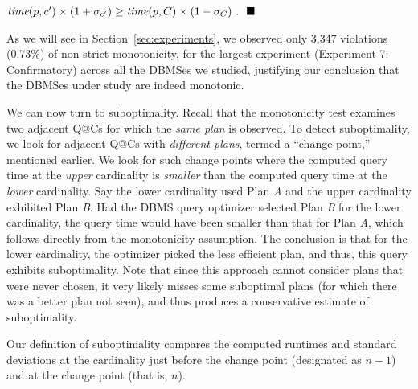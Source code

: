 \documentclass[prodmode,acmtods]{acmsmall}
\makeatletter
\def\QatC{Q{@}C}
\makeatother
\begin{document}
\quad\quad\quad\quad\quad$\hbox{\em time} (p, c^{\prime}) \times (1+\sigma_{c^{\prime}}) \geq
\hbox{\em time} (p,C) \times (1-\sigma_{C})~.~~\hfill\blacksquare$

\vspace{1em}
As we will see in Section~\ref{sec:experiments}, we observed only 3,347
violations (0.73\%) of non-strict monotonicity, for the largest experiment
(Experiment 7: Confirmatory) across all
the \hbox{DBMSes} we studied, justifying our conclusion that the \hbox{DBMSes} under
study are indeed monotonic.

We can now turn to suboptimality. Recall that the monotonicity test examines
two adjacent {\QatC}s for which the {\em same plan} is observed. To detect
suboptimality, we look for adjacent {\QatC}s with {\em different plans}, termed
a ``change point,'' mentioned earlier. We look for such change points where the computed
query time at the {\em upper} cardinality is {\em smaller} than the computed
query time at the {\em lower} cardinality. Say the lower cardinality used
Plan {\em A} and the upper cardinality exhibited Plan {\em B}. Had the \hbox{DBMS}
query optimizer selected Plan {\em B} for the lower cardinality, the query time would have been smaller than that for
Plan {\em A}, which follows directly from the
monotonicity assumption. The conclusion is that for the lower cardinality, the
optimizer picked the less efficient plan, and thus, this query exhibits
\hbox{suboptimality}. Note that since this approach cannot consider plans
that were never chosen, it very likely misses some suboptimal plans (for
which there was a better plan not seen), and thus produces a
conservative estimate of suboptimality.

Our definition of suboptimality compares the computed runtimes 
and standard deviations at the cardinality just before the change
point (designated as $n-1$) and at the change point (that is, $n$).
\end{document}
